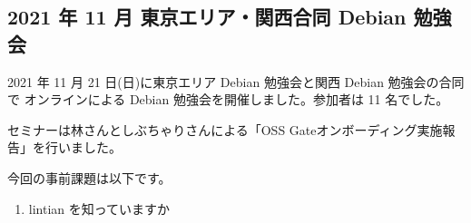 \documentclass[mingoth,a4paper]{jsarticle}
\begin{document}

\subsection{2021 年 11 月 東京エリア・関西合同 Debian 勉強会}

2021 年 11 月 21 日(日)に東京エリア Debian 勉強会と関西 Debian 勉強会の合同で
オンラインによる Debian 勉強会を開催しました。参加者は 11 名でした。

セミナーは林さんとしぶちゃりさんによる「OSS Gateオンボーディング実施報告」を行いました。



今回の事前課題は以下です。

\begin{enumerate}
  \item lintian を知っていますか
\end{enumerate}


\begin{multicols}{2}
{\small
  
}
\end{multicols}

%
%
%
% 







\end{document}
